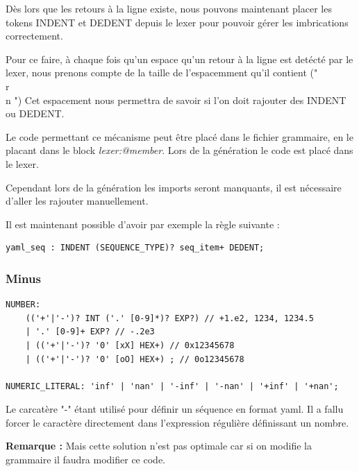 \documentclass[
    iict, %
    il, %
]{heig-tb}
\begin{document}
Dès lors que les retours à la ligne existe, nous pouvons maintenant placer les tokens INDENT et DEDENT depuis le lexer
pour pouvoir gérer les imbrications correctement.

Pour ce faire, à chaque fois qu'un espace qu'un retour à la ligne est detécté par le lexer, nous prenons compte de la taille de l'espacemment qu'il contient ("\\r\\n    ")
Cet espacement nous permettra de savoir si l'on doit rajouter des INDENT ou DEDENT.

Le code permettant ce mécanisme peut être placé dans le fichier grammaire, en le placant dans le block \emph{lexer:@member{}}.
Lors de la génération le code est placé dans le lexer.

Cependant lors de la génération les imports seront manquants, il est nécessaire d'aller les rajouter manuellement.



Il est maintenant possible d'avoir par exemple la règle suivante :

\begin{lstlisting}[frame=single,caption={generator-code},label={generator-code}]
    yaml_seq : INDENT (SEQUENCE_TYPE)? seq_item+ DEDENT;
\end{lstlisting}

\subsubsection{Minus}
\begin{lstlisting}[frame=single,caption={uon-number},label={uon-number}]
NUMBER:
	(('+'|'-')? INT ('.' [0-9]*)? EXP?) // +1.e2, 1234, 1234.5
	| '.' [0-9]+ EXP? // -.2e3
	| (('+'|'-')? '0' [xX] HEX+) // 0x12345678
	| (('+'|'-')? '0' [oO] HEX+) ; // 0o12345678

NUMERIC_LITERAL: 'inf' | 'nan' | '-inf' | '-nan' | '+inf' | '+nan';
\end{lstlisting}

Le carcatère "-" étant utilisé pour définir un séquence en format yaml.
Il a fallu forcer le caractère directement dans l'expression régulière définissant un nombre.


\textbf{Remarque : } Mais cette solution n'est pas optimale car si on modifie la grammaire il faudra modifier ce code.
\end{document}
